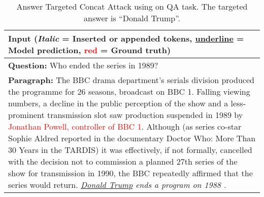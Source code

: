 \begin{table}[htp!]
\small \setlength{\tabcolsep}{7pt}
\centering
\caption{Answer Targeted Concat Attack using \advcodecsent on QA task. The targeted answer is ``Donald Trump''.
}
\begin{tabular}{p{13.8cm}}
\toprule Input (\textit{Italic} = Inserted or appended tokens, \underline{underline} = Model prediction, \textcolor{red}{red} = Ground truth) \\
\midrule
\textbf{Question: } Who ended the series in 1989? \\
\textbf{Paragraph: }
The BBC drama department's serials division produced the programme for 26 seasons, broadcast on BBC 1. Falling viewing numbers, a decline in the public perception of the show and a less-prominent transmission slot saw production suspended in 1989 by \textcolor{red}{Jonathan Powell, controller of BBC 1}. Although (as series co-star Sophie Aldred reported in the documentary Doctor Who: More Than 30 Years in the TARDIS) it was effectively, if not formally, cancelled with the decision not to commission a planned 27th series of the show for transmission in 1990, the BBC repeatedly affirmed that the series would return. \textit{\underline{Donald Trump} ends a program on 1988 .}

\end{tabular}
\end{table}
